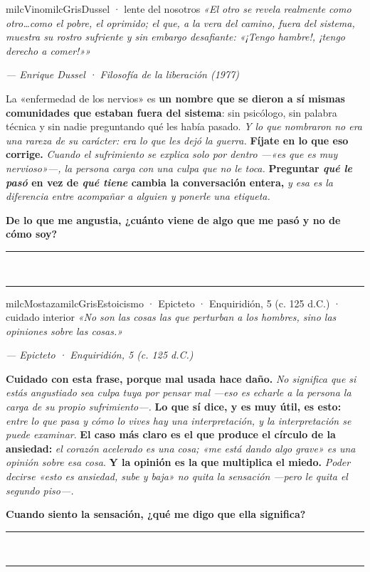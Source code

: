 \documentclass[11pt,letterpaper]{article}
\newcommand{\linead}[1]{\noindent\color{milcLinea}\rule{#1}{0.5pt}\color{milcNegro}}
\begin{document}
\begin{softbox}{milcVino}{milcGris}{Dussel · lente del nosotros}
\textit{«El otro se revela realmente como otro\ldots como el pobre, el oprimido; el que, a la vera del camino, fuera del sistema, muestra su rostro sufriente y sin embargo desafiante: «¡Tengo hambre!, ¡tengo derecho a comer!»»}

{\footnotesize\itshape\color{milcNegro!70}--- Enrique Dussel · Filosofía de la liberación (1977)}

La «enfermedad de los nervios» es \textbf{un nombre que se dieron a sí mismas comunidades que estaban fuera del sistema}: sin psicólogo, sin palabra técnica y sin nadie preguntando qué les había pasado. \emph{Y lo que nombraron no era una rareza de su carácter: era lo que les dejó la guerra.} \textbf{Fíjate en lo que eso corrige.} \emph{Cuando el sufrimiento se explica solo por dentro ---«es que es muy nervioso»---, la persona carga con una culpa que no le toca.} \textbf{Preguntar \emph{qué le pasó} en vez de \emph{qué tiene} cambia la conversación entera,} \emph{y esa es la diferencia entre acompañar a alguien y ponerle una etiqueta.}

\textbf{De lo que me angustia, ¿cuánto viene de algo que me pasó y no de cómo soy?}
\end{softbox}
\linead{\linewidth}\\[1mm]
\linead{\linewidth}

\begin{softbox}{milcMostaza}{milcGris}{Estoicismo · Epicteto · Enquiridión, 5 (c. 125 d.C.) · cuidado interior}
\textit{«No son las cosas las que perturban a los hombres, sino las opiniones sobre las cosas.»}

{\footnotesize\itshape\color{milcNegro!70}--- Epicteto · Enquiridión, 5 (c. 125 d.C.)}

\textbf{Cuidado con esta frase, porque mal usada hace daño.} \emph{No significa que si estás angustiado sea culpa tuya por pensar mal ---eso es echarle a la persona la carga de su propio sufrimiento---.} \textbf{Lo que sí dice, y es muy útil, es esto:} \emph{entre lo que pasa y cómo lo vives hay una interpretación, y la interpretación se puede examinar}. \textbf{El caso más claro es el que produce el círculo de la ansiedad:} \emph{el corazón acelerado es una cosa; «me está dando algo grave» es una opinión sobre esa cosa}. \textbf{Y la opinión es la que multiplica el miedo.} \emph{Poder decirse «esto es ansiedad, sube y baja» no quita la sensación ---pero le quita el segundo piso---.}

\textbf{Cuando siento la sensación, ¿qué me digo que ella significa?}
\end{softbox}
\linead{\linewidth}\\[1mm]
\linead{\linewidth}
\end{document}
